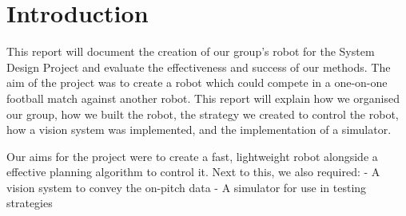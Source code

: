 \section{Introduction}

This report will document the creation of our group’s robot for the System Design Project and evaluate the effectiveness and success of our methods. 
The aim of the project was to create a robot which could compete in a one-on-one football match against another robot. This report will explain how we organised our group, how we built the robot, the strategy we created to control the robot, how a vision system was implemented, and the implementation of a simulator.

Our aims for the project were to create a fast, lightweight robot alongside a effective planning algorithm to control it. Next to this, we also required:
- A vision system to convey the on-pitch data
- A simulator for use in testing strategies